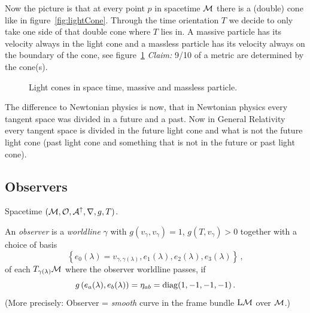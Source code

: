 \documentclass[11pt, a4paper, twocolumn]{article} %
\begin{document}
    Now the picture is that at every point $p$ in spacetime $\mathcal{M}$ there is a (double) cone
    like in figure~\ref{fig:lightCone}.
    Through the time orientation $T$ we decide to only take one side of that double
    cone where $T$ lies in.
    A massive particle has its velocity always in the light cone and a massless particle has its
    velocity always on the boundary of the cone, see figure~\ref{fig:spacetimeLightCones}
    \textit{Claim:} 9/10 of a metric are determined by the cone(s).
    
    \begin{figure}[tbh]
        \centering\def\svgwidth{\columnwidth}
        
        \caption{Light cones in space time, massive and massless particle.}
        \label{fig:spacetimeLightCones}
    \end{figure}
    \begin{note}
        The difference to Newtonian physics is now, that in Newtonian physics every tangent space was
        divided in a future and a past. 
        Now in General Relativity every tangent space is divided in the future light cone
        and what is not the future light cone (past light cone and something that is not in the
        future or past light cone).
    \end{note}

    \subsection{Observers}
    Spacetime $(\mathcal{M}, \mathcal{O}, \mathcal{A}^\uparrow, \nabla, g, T)$.
    \begin{defn}[Observer]
        An \textit{observer} is a \textit{worldline} $\gamma$ with
        $g(v_\gamma, v_\gamma) = 1$, $g(T, v_\gamma)>0$
        together with a choice of basis
        \begin{equation}
            \left\{ e_0(\lambda) = v_{\gamma,\gamma(\lambda)}, e_1(\lambda), e_2(\lambda), e_3(\lambda) \right\}\,,
        \end{equation}
        of each $T_{\gamma(\lambda)}\mathcal{M}$ where the observer worldline passes,
        if
        \begin{equation}
            g\left( e_a(\lambda), e_b(\lambda) \right) = \eta_{ab} = \operatorname{diag}(1, -1, -1, -1)\,.
        \end{equation}
        (More precisely: Observer = \textit{smooth} curve in the frame bundle
        $\mathrm{L}\mathcal{M}$ over $\mathcal{M}$.)
    \end{defn}
\end{document}
